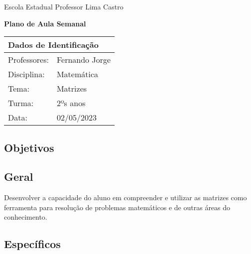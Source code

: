 \documentclass[oneside,a4paper,12pt]{article}
\newcommand{\universidade}{Escola Estadual Professor Lima Castro}
\newcommand{\professores}{Fernando Jorge}
\newcommand{\disciplina}{Matemática}
\newcommand{\tema}{Matrizes}
\newcommand{\turma}{2ºs anos}
\newcommand{\data}{02/05/2023}
\begin{document}
  \pagestyle{empty}

	\begin{center}
	
	  \universidade
	  \par
	  \vspace{10pt}
	  \LARGE \textbf{Plano de Aula Semanal}

	\end{center}

  \vspace{10pt}

	\begin{tabular}{ |l|p{12cm}| }

	  \hline
	  \multicolumn{2}{|l|}{\textbf{Dados de Identificação}} \\
	  \hline
	  Professores:         &    \professores           \\
	  \hline
	  Disciplina:        &    \disciplina          \\
	  \hline
	  Tema:              &    \tema                \\
	  \hline
	  Turma:             &    \turma               \\
	  \hline
	  Data:              &    \data                \\
	  \hline

	\end{tabular}

  \begin{snugshade}
  \section{Objetivos} %
  \end{snugshade}
  
  \subsection{Geral} %
  
  Desenvolver a capacidade do aluno em compreender e utilizar as matrizes como ferramenta para resolução de problemas matemáticos e de outras áreas do conhecimento.
    
  \subsection{Específicos} %
    
\end{document}
